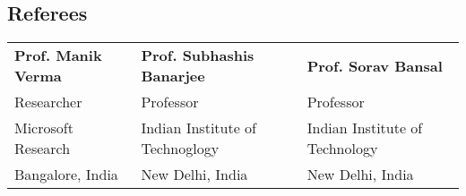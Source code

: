 \documentclass[margin,line]{resume}
\begin{document}
\begin{resume}
    \section{\mysidestyle Referees}
    \begin{tabular}{@{}p{4cm}p{5.5cm}p{5cm}}
    \textbf{Prof. Manik Verma}       	&  \textbf{Prof. Subhashis Banarjee} 	&  \textbf{Prof. Sorav Bansal}          \\
    Researcher                          &  Professor                       	&	Professor			\\
    Microsoft Research                	&  Indian Institute of Technoglogy      & Indian Institute of Technology	\\
    Bangalore, India          		&  New Delhi, India        		& New Delhi, India			\\
    \end{tabular}

\end{resume}
\end{document}
